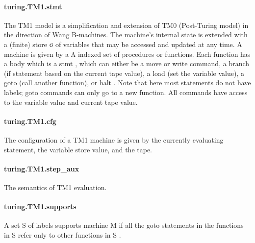 \documentclass{article}
\begin{document}
\paragraph{turing.TM1.stmt}
\par
The TM1 model is a simplification and extension of TM0
(Post-Turing model) in the direction of Wang B-machines. The machine's
internal state is extended with a (finite) store 
\colorbox[RGB]{253,246,227}{{{{\color[RGB]{101, 123, 131} σ }}}} of variables
that may be accessed and updated at any time.
A machine is given by a 
\colorbox[RGB]{253,246,227}{{{{\color[RGB]{101, 123, 131} Λ }}}} indexed set of procedures or functions.
Each function has a body which is a 
\colorbox[RGB]{253,246,227}{{{{\color[RGB]{101, 123, 131} stmt }}}}, which can either be a
\colorbox[RGB]{253,246,227}{{{{\color[RGB]{101, 123, 131} move }}}} or 
\colorbox[RGB]{253,246,227}{{{{\color[RGB]{101, 123, 131} write }}}} command, a 
\colorbox[RGB]{253,246,227}{{{{\color[RGB]{101, 123, 131} branch }}}} (if statement based on the
current tape value), a 
\colorbox[RGB]{253,246,227}{{{{\color[RGB]{101, 123, 131} load }}}} (set the variable value),
a 
\colorbox[RGB]{253,246,227}{{{{\color[RGB]{101, 123, 131} goto }}}} (call another function), or 
\colorbox[RGB]{253,246,227}{{{{\color[RGB]{101, 123, 131} halt }}}}. Note that here
most statements do not have labels; 
\colorbox[RGB]{253,246,227}{{{{\color[RGB]{101, 123, 131} goto }}}} commands can only
go to a new function. All commands have access to the variable value
and current tape value.
\paragraph{turing.TM1.cfg}
\par
The configuration of a TM1 machine is given by the currently
evaluating statement, the variable store value, and the tape.
\paragraph{turing.TM1.step\_aux}
\par
The semantics of TM1 evaluation.
\paragraph{turing.TM1.supports}
\par
A set 
\colorbox[RGB]{253,246,227}{{{{\color[RGB]{101, 123, 131} S }}}} of labels supports machine 
\colorbox[RGB]{253,246,227}{{{{\color[RGB]{101, 123, 131} M }}}} if all the 
\colorbox[RGB]{253,246,227}{{{{\color[RGB]{101, 123, 131} goto }}}}statements in the functions in 
\colorbox[RGB]{253,246,227}{{{{\color[RGB]{101, 123, 131} S }}}} refer only to other functions
in 
\colorbox[RGB]{253,246,227}{{{{\color[RGB]{101, 123, 131} S }}}}.
\end{document}
